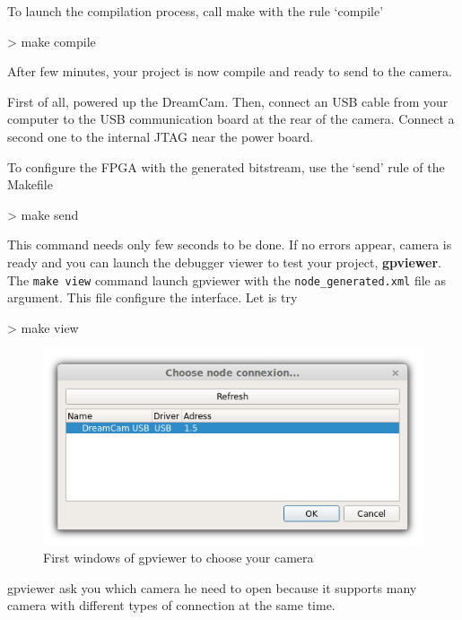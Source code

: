 \documentclass[10pt,a4paper]{article}
\begin{document}
To launch the compilation process, call make with the rule `compile'

\begin{sample}
> make compile
\end{sample}

After few minutes, your project is now compile and ready to send to the camera.

First of all, powered up the DreamCam. Then, connect an USB cable from your computer to the USB communication board at the rear of the camera. Connect a second one to the internal JTAG near the power board.

To configure the FPGA with the generated bitstream, use the `send' rule of the Makefile

\begin{sample}
> make send
\end{sample}

This command needs only few seconds to be done. If no errors appear, camera is ready and you can launch the debugger viewer to test your project, \textbf{gpviewer}. The \texttt{make view} command launch gpviewer with the \texttt{node\_generated.xml} file as argument. This file configure the interface. Let is try

\begin{sample}
> make view
\end{sample}

\begin{figure}[h!]
\centering
\includegraphics[scale=0.6]{gpviewer_connect_node.jpg}
\caption{First windows of gpviewer to choose your camera}
\end{figure}

gpviewer ask you which camera he need to open because it supports many camera with different types of connection at the same time.
\end{document}
